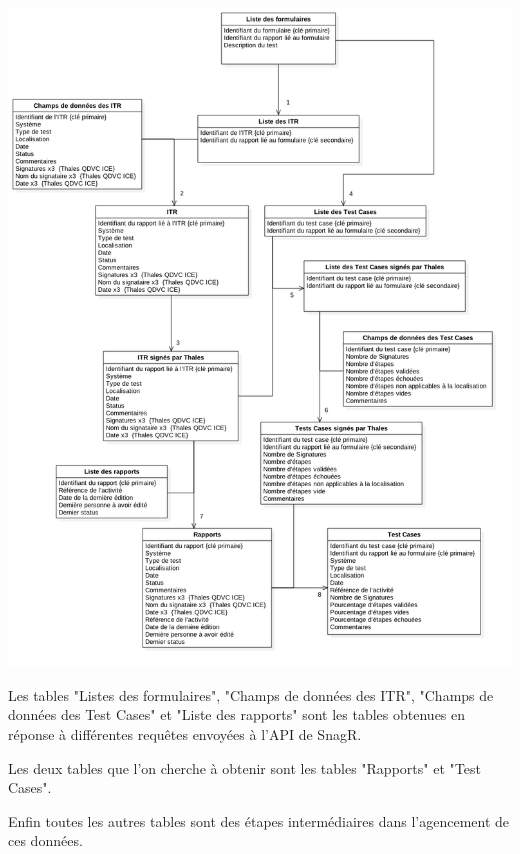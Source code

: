 \newpage
\begin{center}
\includegraphics[scale=0.5]{ressources/images/figures/bd.png}
\end{center}
\newpage

Les tables "Listes des formulaires", "Champs de données des ITR", "Champs de données des Test Cases" et "Liste des rapports" sont les tables obtenues en réponse à différentes requêtes envoyées à l'\gls{API} de \gls{SnagR}.

Les deux tables que l'on cherche à obtenir sont les tables "Rapports" et "Test Cases".

Enfin toutes les autres tables sont des étapes intermédiaires dans l'agencement de ces données.

